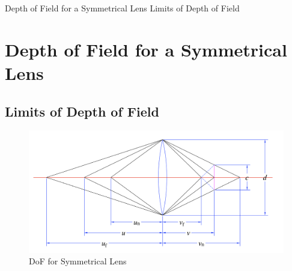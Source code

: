 \documentclass[11pt, oneside]{scrartcl}   	%
\begin{document}
Depth of Field for a Symmetrical Lens Limits of Depth of Field
\section{Depth of Field for a Symmetrical Lens }
\label{sec:depth-field-symm}

\subsection{Limits of Depth of Field}
\label{sec:limits-depth-field}
\begin{figure}[htbp] %
   \centering
   \includegraphics[width=\linewidth]{figure/fig_dofd_1} 
   \caption{DoF for Symmetrical Lens}
   \label{fig:symlens}
\end{figure}
\end{document}
